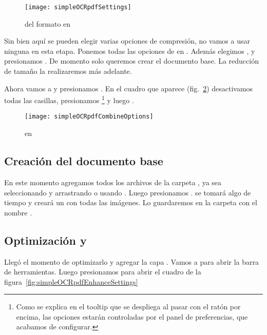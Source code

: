 \documentclass[%
	a5paper,
	10pt,
	twoside,
	openright,
	final,
]{memoir}
\begin{document}
	\begin{figure}
		\centering
		\texttt{[image: simpleOCRpdfSettings]}
		\caption{ del formato \tiff en \acrobat\label{fig:simpleOCRpdfSettings}}
	\end{figure}

	Sin bien aquí se pueden elegir varias opciones de compresión, no vamos a usar ninguna en esta etapa. Ponemos todas las opciones de  en . Además elegimos ,  y presionamos . De momento solo queremos crear el documento base. La reducción de tamaño la realizaremos más adelante.

	Ahora vamos a  y presionamos . En el cuadro que aparece (fig.~\ref{fig:simpleOCRpdfCombineOptions}) desactivamos todas las casillas, presionamos \footnote{Como se explica en el tooltip que se despliega al pasar con el ratón por encima, las opciones estarán controladas por el panel de preferencias, que acabamos de configurar.} y luego .

	\begin{figure}
		\centering
		\texttt{[image: simpleOCRpdfCombineOptions]}
		\caption{ en \acrobat\label{fig:simpleOCRpdfCombineOptions}}
	\end{figure}

	\subsection{Creación del documento base} En este momento agregamos todos los archivos de la carpeta , ya sea seleccionando y arrastrando o usando . Luego presionamos . \acrobat se tomará algo de tiempo y creará un \pdf con todas las imágenes. Lo guardaremos en la carpeta  con el nombre .

	\subsection{Optimización y \texorpdfstring{\ocr}{OCR}} Llegó el momento de optimizarlo y agregar la capa \ocr. Vamos a  para abrir la barra de herramientas. Luego presionamos  para abrir el cuadro de la figura~\ref{fig:simpleOCRpdfEnhanceSettings}
\end{document}
